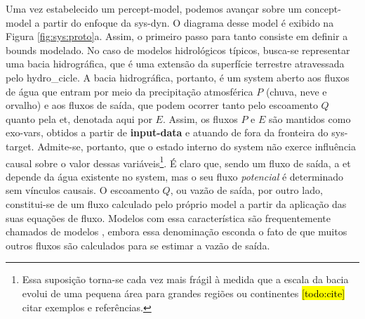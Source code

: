 \documentclass[./main.tex]{subfiles}
\begin{document}
\par Uma vez estabelecido um \gls{percept-model}, podemos avançar sobre um \gls{concept-model} a partir do enfoque da \gls{sys-dyn}. O diagrama desse \gls{model} é exibido na Figura \ref{fig:sys:proto}a. Assim, o primeiro passo para tanto consiste em definir a \gls{bounds} modelado. No caso de modelos hidrológicos típicos, busca-se representar uma bacia hidrográfica, que é uma extensão da superfície terrestre atravessada pelo \gls{hydro_cicle}. A bacia hidrográfica, portanto, é um \gls{system} aberto aos fluxos de água que entram por meio da precipitação atmosférica $P$ (chuva, neve e orvalho) e aos fluxos de saída, que podem ocorrer tanto pelo escoamento $Q$ quanto pela \acrlong{et}, denotada aqui por $E$. Assim, os fluxos $P$ e $E$ são mantidos como \gls{exo-vars}, obtidos a partir de \textbf{\gls{input-data}} e atuando de fora da fronteira do \gls{sys-target}. Admite-se, portanto, que o estado interno do \gls{system} não exerce influência causal sobre o valor dessas variáveis\footnote{Essa suposição torna-se cada vez mais frágil à medida que a escala da bacia evolui de uma pequena área para grandes regiões ou continentes \hl{[todo:cite]} citar exemplos e referências.}. É claro que, sendo um fluxo de saída, a \acrlong{et} depende da água existente no \gls{system}, mas o seu fluxo \textit{potencial} é determinado sem vínculos causais. O escoamento $Q$, ou vazão de saída, por outro lado, constitui-se de um fluxo calculado pelo próprio \gls{model} a partir da aplicação das suas equações de fluxo. Modelos com essa característica são frequentemente chamados de modelos , embora essa denominação esconda o fato de que muitos outros fluxos são calculados para se estimar a vazão de saída.
\end{document}
